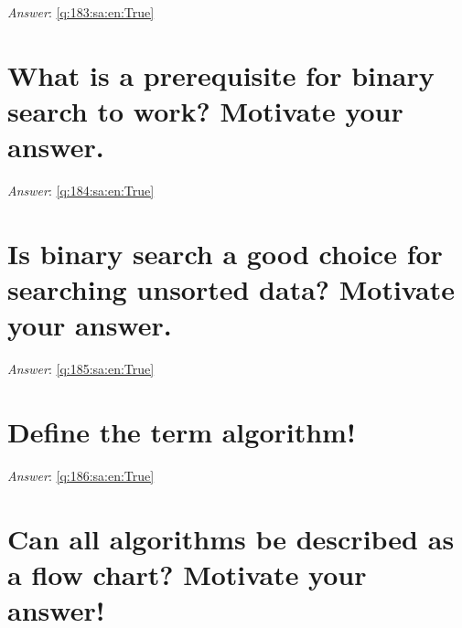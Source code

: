 \documentclass[a4paper,11pt,oneside]{book}
\begin{document}
\begin{sloppypar}
\noindent\makebox[\textwidth]{\hrulefill}

\vspace{1cm}

\textit{Answer}: \autoref{q:183:sa:en:True}



\section{What is a prerequisite for binary search to work? Motivate your answer.}

\label{q:184:sa:en:False}

\vspace{2cm}

\noindent\makebox[\textwidth]{\hrulefill}

\vspace{1cm}

\textit{Answer}: \autoref{q:184:sa:en:True}



\section{Is binary search a good choice for searching unsorted data? Motivate your answer.}

\label{q:185:sa:en:False}

\vspace{2cm}

\noindent\makebox[\textwidth]{\hrulefill}

\vspace{1cm}

\textit{Answer}: \autoref{q:185:sa:en:True}



\section{Define the term algorithm!}

\label{q:186:sa:en:False}

\vspace{2cm}

\noindent\makebox[\textwidth]{\hrulefill}

\vspace{1cm}

\textit{Answer}: \autoref{q:186:sa:en:True}



\section{Can all algorithms be described as a flow chart? Motivate your answer!}


\end{sloppypar}
\end{document}
